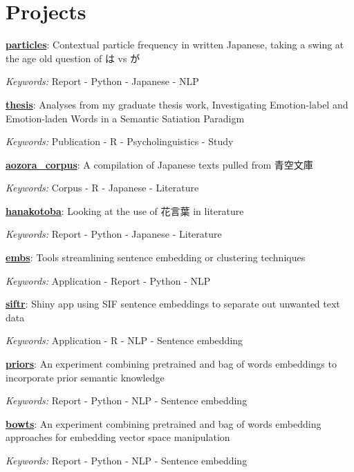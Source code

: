 \documentclass[a4paper,9pt]{extarticle}
\begin{document}
\section*{Projects}
\noindent\textbf{\href{https://github.com/ryancahildebrandt/particles}{particles}}: Contextual particle frequency in written Japanese, taking a swing at the age old question of は vs が

\textit{Keywords:} Report - Python - Japanese - NLP

\noindent\textbf{\href{https://github.com/ryancahildebrandt/thesis}{thesis}}: Analyses from my graduate thesis work, Investigating Emotion-label and Emotion-laden Words in a Semantic Satiation Paradigm

\textit{Keywords:} Publication - R - Psycholinguistics - Study

\noindent\textbf{\href{https://github.com/ryancahildebrandt/aozora_corpus}{aozora{\_}corpus}}: A compilation of Japanese texts pulled from 青空文庫

\textit{Keywords:} Corpus - R - Japanese - Literature

\noindent\textbf{\href{https://github.com/ryancahildebrandt/hanakotoba}{hanakotoba}}: Looking at the use of 花言葉 in literature 

\textit{Keywords:} Report - Python - Japanese - Literature

\noindent\textbf{\href{https://github.com/ryancahildebrandt/embs}{embs}}: Tools streamlining sentence embedding or clustering techniques

\textit{Keywords:} Application - Report - Python - NLP

\noindent\textbf{\href{https://github.com/ryancahildebrandt/siftr}{siftr}}: Shiny app using SIF sentence embeddings to separate out unwanted text data

\textit{Keywords:} Application - R - NLP - Sentence embedding

\noindent\textbf{\href{https://github.com/ryancahildebrandt/priors}{priors}}: An experiment combining pretrained and bag of words embeddings to incorporate prior semantic knowledge

\textit{Keywords:} Report - Python - NLP - Sentence embedding

\noindent\textbf{\href{https://github.com/ryancahildebrandt/bowts}{bowts}}: An experiment combining pretrained and bag of words embedding approaches for embedding vector space manipulation

\textit{Keywords:} Report - Python - NLP - Sentence embedding
\end{document}
